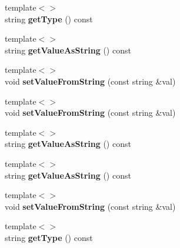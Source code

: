 \begin{DoxyCompactItemize}
\item 
\hypertarget{classrrp_1_1_parameter_a49aebd913ae26cd0a3c2cce3c758171e}{{\footnotesize template$<$$>$ }\\string {\bfseries get\-Type} () const}\label{classrrp_1_1_parameter_a49aebd913ae26cd0a3c2cce3c758171e}

\item 
\hypertarget{classrrp_1_1_parameter_a2f3b3ce7dbe0f955aa7c177637f9fbb0}{{\footnotesize template$<$$>$ }\\string {\bfseries get\-Value\-As\-String} () const}\label{classrrp_1_1_parameter_a2f3b3ce7dbe0f955aa7c177637f9fbb0}

\item 
\hypertarget{classrrp_1_1_parameter_a1621a0f9b6cd7c6973f1a660622becf7}{{\footnotesize template$<$$>$ }\\void {\bfseries set\-Value\-From\-String} (const string \&val)}\label{classrrp_1_1_parameter_a1621a0f9b6cd7c6973f1a660622becf7}

\item 
\hypertarget{classrrp_1_1_parameter_a1621a0f9b6cd7c6973f1a660622becf7}{{\footnotesize template$<$$>$ }\\void {\bfseries set\-Value\-From\-String} (const string \&val)}\label{classrrp_1_1_parameter_a1621a0f9b6cd7c6973f1a660622becf7}

\item 
\hypertarget{classrrp_1_1_parameter_a2f3b3ce7dbe0f955aa7c177637f9fbb0}{{\footnotesize template$<$$>$ }\\string {\bfseries get\-Value\-As\-String} () const}\label{classrrp_1_1_parameter_a2f3b3ce7dbe0f955aa7c177637f9fbb0}

\item 
\hypertarget{classrrp_1_1_parameter_a2f3b3ce7dbe0f955aa7c177637f9fbb0}{{\footnotesize template$<$$>$ }\\string {\bfseries get\-Value\-As\-String} () const}\label{classrrp_1_1_parameter_a2f3b3ce7dbe0f955aa7c177637f9fbb0}

\item 
\hypertarget{classrrp_1_1_parameter_a1621a0f9b6cd7c6973f1a660622becf7}{{\footnotesize template$<$$>$ }\\void {\bfseries set\-Value\-From\-String} (const string \&val)}\label{classrrp_1_1_parameter_a1621a0f9b6cd7c6973f1a660622becf7}

\item 
\hypertarget{classrrp_1_1_parameter_a49aebd913ae26cd0a3c2cce3c758171e}{{\footnotesize template$<$$>$ }\\string {\bfseries get\-Type} () const}\label{classrrp_1_1_parameter_a49aebd913ae26cd0a3c2cce3c758171e}


\end{DoxyCompactItemize}

